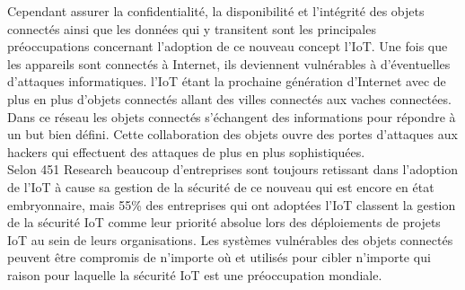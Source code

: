\documentclass[a4paper,12pt]{report}
\begin{document}
Cependant assurer la confidentialité, la disponibilité et l'intégrité des objets connectés ainsi que les données qui y transitent sont les principales préoccupations concernant l'adoption de ce nouveau concept l'IoT. Une fois que les appareils sont connectés à Internet, ils deviennent vulnérables à d'éventuelles d'attaques informatiques. l'IoT étant la prochaine génération  d'Internet \cite{cisco} avec de plus en plus d'objets connectés allant des villes connectés aux vaches connectées. Dans ce réseau les objets connectés s’échangent des informations pour répondre à un but bien défini. Cette collaboration des objets ouvre des portes d’attaques aux hackers qui effectuent des attaques de plus en plus sophistiquées.\\

Selon 451 Research \cite{ref451rec} beaucoup d'entreprises sont toujours retissant dans l'adoption de l'IoT à cause sa gestion de la sécurité de ce nouveau qui est encore en état embryonnaire, mais 55\% des entreprises qui ont adoptées l'IoT classent la gestion de la sécurité IoT comme leur priorité absolue lors des déploiements de projets IoT au sein de leurs organisations. Les systèmes vulnérables des objets connectés  peuvent être compromis de n’importe où et utilisés pour cibler n’importe qui raison pour laquelle la sécurité IoT est une préoccupation mondiale.\\
\end{document}
